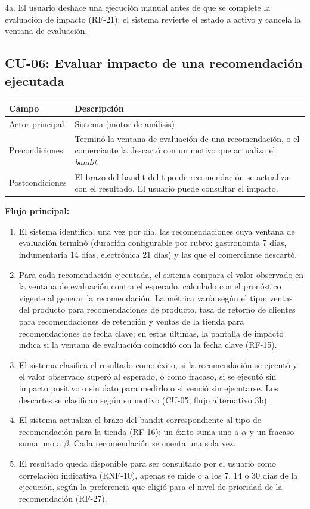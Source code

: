 \noindent 4a. El usuario deshace una ejecución manual antes de que se complete la evaluación de impacto (RF-21): el sistema revierte el estado a activo y cancela la ventana de evaluación.

\subsection{CU-06: Evaluar impacto de una recomendación ejecutada}
\label{sec:cu-06}

\begin{table}[h]
\centering
\renewcommand{\arraystretch}{1.3}
\begin{tabular}{|m{3cm}|m{11.3cm}|}
\hline
\textbf{Campo} & \textbf{Descripción} \\
\hline
Actor principal & Sistema (motor de análisis) \\
\hline
Precondiciones & Terminó la ventana de evaluación de una recomendación, o el comerciante la descartó con un motivo que actualiza el \emph{bandit}. \\
\hline
Postcondiciones & El brazo del bandit del tipo de recomendación se actualiza con el resultado. El usuario puede consultar el impacto. \\
\hline
\end{tabular}
\end{table}

\noindent\textbf{Flujo principal:}
\begin{enumerate}
    \item El sistema identifica, una vez por día, las recomendaciones cuya ventana de evaluación terminó (duración configurable por rubro: gastronomía 7 días, indumentaria 14 días, electrónica 21 días) y las que el comerciante descartó.
    \item Para cada recomendación ejecutada, el sistema compara el valor observado en la ventana de evaluación contra el esperado, calculado con el pronóstico vigente al generar la recomendación. La métrica varía según el tipo: ventas del producto para recomendaciones de producto, tasa de retorno de clientes para recomendaciones de retención y ventas de la tienda para recomendaciones de fecha clave; en estas últimas, la pantalla de impacto indica si la ventana de evaluación coincidió con la fecha clave (RF-15).
    \item El sistema clasifica el resultado como éxito, si la recomendación se ejecutó y el valor observado superó al esperado, o como fracaso, si se ejecutó sin impacto positivo o sin dato para medirlo o si venció sin ejecutarse. Los descartes se clasifican según su motivo (CU-05, flujo alternativo 3b).
    \item El sistema actualiza el brazo del bandit correspondiente al tipo de recomendación para la tienda (RF-16): un éxito suma uno a $\alpha$ y un fracaso suma uno a $\beta$. Cada recomendación se cuenta una sola vez.
    \item El resultado queda disponible para ser consultado por el usuario como correlación indicativa (RNF-10), apenas se mide o a los 7, 14 o 30 días de la ejecución, según la preferencia que eligió para el nivel de prioridad de la recomendación (RF-27).
\end{enumerate}

